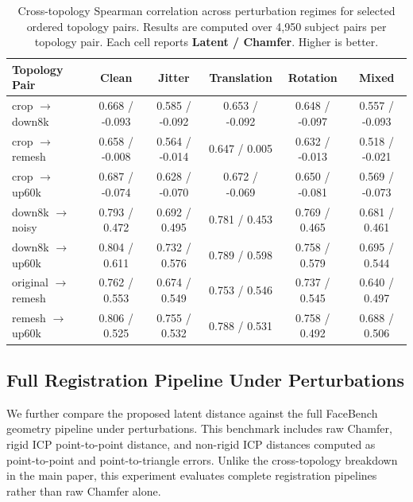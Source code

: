 \documentclass{article}
\begin{document}
\begin{table}[h]
\centering
\small
\caption{
Cross-topology Spearman correlation across perturbation regimes for selected
ordered topology pairs. Results are computed over 4,950 subject pairs per
topology pair. Each cell reports \textbf{Latent / Chamfer}. Higher is better.
}
\label{tab:xtopo_latent_chamfer_app}
\begin{tabular}{lccccc}
\toprule
Topology Pair & Clean & Jitter & Translation & Rotation & Mixed \\
\midrule
crop $\rightarrow$ down8k
& 0.668 / -0.093
& 0.585 / -0.092
& 0.653 / -0.092
& 0.648 / -0.097
& 0.557 / -0.093 \\

crop $\rightarrow$ remesh
& 0.658 / -0.008
& 0.564 / -0.014
& 0.647 / 0.005
& 0.632 / -0.013
& 0.518 / -0.021 \\

crop $\rightarrow$ up60k
& 0.687 / -0.074
& 0.628 / -0.070
& 0.672 / -0.069
& 0.650 / -0.081
& 0.569 / -0.073 \\

down8k $\rightarrow$ noisy
& 0.793 / 0.472
& 0.692 / 0.495
& 0.781 / 0.453
& 0.769 / 0.465
& 0.681 / 0.461 \\

down8k $\rightarrow$ up60k
& 0.804 / 0.611
& 0.732 / 0.576
& 0.789 / 0.598
& 0.758 / 0.579
& 0.695 / 0.544 \\

original $\rightarrow$ remesh
& 0.762 / 0.553
& 0.674 / 0.549
& 0.753 / 0.546
& 0.737 / 0.545
& 0.640 / 0.497 \\

remesh $\rightarrow$ up60k
& 0.806 / 0.525
& 0.755 / 0.532
& 0.788 / 0.531
& 0.758 / 0.492
& 0.688 / 0.506 \\
\bottomrule
\end{tabular}
\end{table}

\subsection{Full Registration Pipeline Under Perturbations}
\label{app:facebench_pipeline_perturbations}

We further compare the proposed latent distance against the full FaceBench
geometry pipeline under perturbations. This benchmark includes raw Chamfer,
rigid ICP point-to-point distance, and non-rigid ICP distances computed as
point-to-point and point-to-triangle errors. Unlike the cross-topology breakdown
in the main paper, this experiment evaluates complete registration pipelines
rather than raw Chamfer alone.
\end{document}

